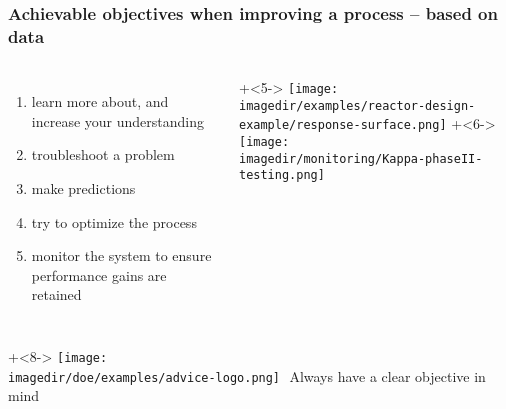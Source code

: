 \documentclass[handout,11pt,aspectratio=169,mathserif]{beamer}
\begin{document}
\begin{frame}\frametitle{Achievable objectives when improving a process -- based on data}
	
	\begin{columns}[t]
		\Large
			\begin{enumerate}
				\item	learn more about, and increase your understanding  \pause
				\item	troubleshoot a problem  \pause
				\item	make predictions  \pause
				\item	try to optimize the process  \pause
				\item	monitor the system to ensure performance gains are retained  \pause
			\end{enumerate}
	
			\onslide+<5->{
				\texttt{[image: \\imagedir/examples/reactor-design-example/response-surface.png]}
			}
			\onslide+<6->{
				\texttt{[image: \\imagedir/monitoring/Kappa-phaseII-testing.png]}
			}
			
	\end{columns}
	
	\vspace{-1cm}

	\vspace{1cm}
	\onslide+<8->{
		\hfill \texttt{[image: \\imagedir/doe/examples/advice-logo.png]}
		\,\,{\color{blue}Always have a clear objective in mind}
	}
\end{frame}
\end{document}
